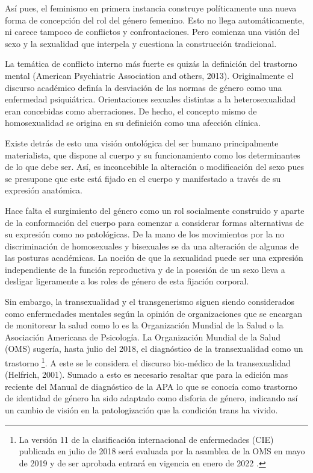 Así pues, el feminismo en primera instancia construye políticamente una nueva
forma de concepción del rol del género femenino.
Esto no llega automáticamente, ni carece tampoco de conflictos y
confrontaciones.
Pero comienza una visión del sexo y la sexualidad que interpela y cuestiona la
construcción tradicional.

La temática de conflicto interno más fuerte es quizás la definición del
trastorno mental (American Psychiatric Association and others, 2013).
Originalmente el discurso académico definía la desviación de las normas de
género como una enfermedad psiquiátrica.
Orientaciones sexuales distintas a la heterosexualidad eran concebidas como
aberraciones.
De hecho, el concepto mismo de homosexualidad se origina en su definición como
una afección clínica.

Existe detrás de esto una visión ontológica del ser humano principalmente
materialista, que dispone al cuerpo y su funcionamiento como los determinantes
de lo que debe ser.
Así, es inconcebible la alteración o modificación del sexo pues se presupone que
este está fijado en el cuerpo y manifestado a través de su expresión anatómica.

Hace falta el surgimiento del género como un rol socialmente construido y aparte
de la conformación del cuerpo para comenzar a considerar formas alternativas de
su expresión como no patológicas.
De la mano de los movimientos por la no discriminación de homosexuales y
bisexuales se da una alteración de algunas de las posturas académicas.
La noción de que la sexualidad puede ser una expresión independiente de la
función reproductiva y de la posesión de un sexo lleva a desligar ligeramente a
los roles de género de esta fijación corporal.

Sin embargo, la transexualidad y el transgenerismo siguen siendo considerados
como enfermedades mentales según la opinión de organizaciones que se encargan de
monitorear la salud como lo es la Organización Mundial de la Salud o la
Asociación Americana de Psicología.
La Organización Mundial de la Salud (OMS) sugería, hasta julio del 2018, el diagnóstico de la transexualidad como un trastorno \footnote{La versión 11 de la clasificación internacional de enfermedades (CIE) publicada en julio de 2018 será evaluada por la asamblea de la OMS en mayo de 2019 y de ser aprobada entrará en vigencia en enero de 2022 \parencite{Suarez2018}.}.
A este se le considera el discurso bio-médico de la transexualidad (Helfrich,
2001).
Sumado a esto es necesario resaltar que para la edición mas reciente del Manual
de diagnóstico de la APA lo que se conocía como trastorno de identidad de género
ha sido adaptado como disforia de género, indicando así un cambio de visión
en la patologización que la condición trans ha vivido.

